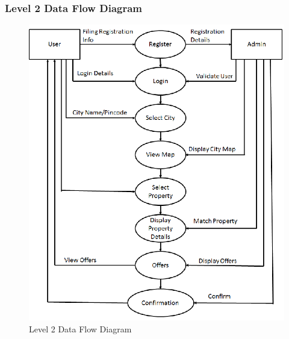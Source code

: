 \documentclass[11pt,fleqn]{book} %
\begin{document}
\newpage
\subsubsection{Level 2 Data Flow Diagram}
\begin{center}
    \begin{figure}[!ht]
        \centering
        \includegraphics[scale=0.8]{Pictures/Dataflow2.png}
        \caption{Level 2 Data Flow Diagram}
        \label{fig:my_label}
    \end{figure}
\end{center}


\newpage
\end{document}
